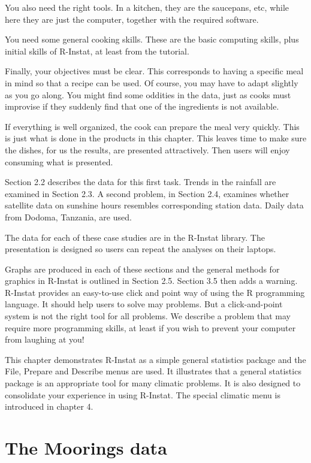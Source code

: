 \documentclass[
  letterpaper,
  DIV=11,
  numbers=noendperiod]{scrreprt}
\begin{document}
You also need the right tools. In a kitchen, they are the saucepans,
etc, while here they are just the computer, together with the required
software.

You need some general cooking skills. These are the basic computing
skills, plus initial skills of R-Instat, at least from the tutorial.

Finally, your objectives must be clear. This corresponds to having a
specific meal in mind so that a recipe can be used. Of course, you may
have to adapt slightly as you go along. You might find some oddities in
the data, just as cooks must improvise if they suddenly find that one of
the ingredients is not available.

If everything is well organized, the cook can prepare the meal very
quickly. This is just what is done in the products in this chapter. This
leaves time to make sure the dishes, for us the results, are presented
attractively. Then users will enjoy consuming what is presented.

Section 2.2 describes the data for this first task. Trends in the
rainfall are examined in Section 2.3. A second problem, in Section 2.4,
examines whether satellite data on sunshine hours resembles
corresponding station data. Daily data from Dodoma, Tanzania, are used.

The data for each of these case studies are in the R-Instat library. The
presentation is designed so users can repeat the analyses on their
laptops.

Graphs are produced in each of these sections and the general methods
for graphics in R-Instat is outlined in Section 2.5. Section 3.5 then
adds a warning. R-Instat provides an easy-to-use click and point way of
using the R programming language. It should help users to solve may
problems. But a click-and-point system is not the right tool for all
problems. We describe a problem that may require more programming
skills, at least if you wish to prevent your computer from laughing at
you!

This chapter demonstrates R-Instat as a simple general statistics
package and the File, Prepare and Describe menus are used. It
illustrates that a general statistics package is an appropriate tool for
many climatic problems. It is also designed to consolidate your
experience in using R-Instat. The special climatic menu is introduced in
chapter 4.

\section{The Moorings data}\label{the-moorings-data}
\end{document}
